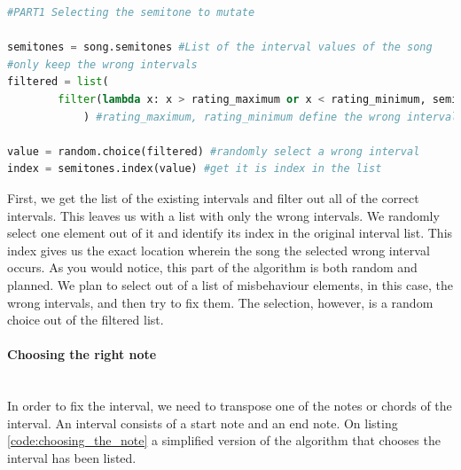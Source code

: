 \documentclass[a4paper]{article}
\begin{document}
\begin{lstlisting}[language=Python,caption={Part 1 of the simplified version of the Neighbour pitch mutation algorithm: choosing the interval index.},captionpos=b,label=code:choosing_the_interval]
#PART1 Selecting the semitone to mutate

semitones = song.semitones #List of the interval values of the song
#only keep the wrong intervals
filtered = list(
		filter(lambda x: x > rating_maximum or x < rating_minimum, semitones)
			) #rating_maximum, rating_minimum define the wrong intervals
			
value = random.choice(filtered) #randomly select a wrong interval
index = semitones.index(value) #get it is index in the list

\end{lstlisting}
First, we get the list of the existing intervals and filter out all of the correct intervals. This leaves us with a list with only the wrong intervals. We randomly select one element out of it and identify its index in the original interval list. This index gives us the exact location wherein the song the selected wrong interval occurs. As you would notice, this part of the algorithm is both random and planned. We plan to select out of a list of misbehaviour elements, in this case, the wrong intervals, and then try to fix them. The selection, however, is a random choice out of the filtered list.

\paragraph{Choosing the right note}\mbox{}\\
In order to fix the interval, we need to transpose one of the notes or chords of the interval. An interval consists of a start note and an end note. On listing \ref{code:choosing_the_note} a simplified version of the algorithm that chooses the interval has been listed. 
\end{document}
